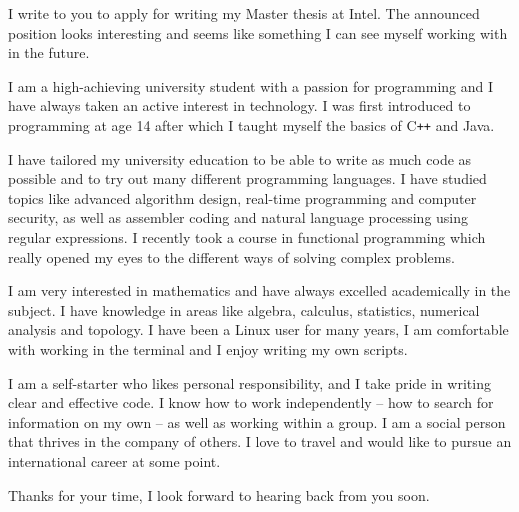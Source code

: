 I write to you to apply for writing my Master thesis at Intel. The announced position looks interesting and seems like something I can see myself working with in the future.

I am a high-achieving university student with a passion for programming and I have always taken an active interest in technology. I was first introduced to programming at age 14 after which I taught myself the basics of C\texttt{++} and Java.

I have tailored my university education to be able to write as much code as possible and to try out many different programming languages. I have studied topics like advanced algorithm design, real-time programming and computer security, as well as assembler coding and natural language processing using regular expressions. I recently took a course in functional programming which really opened my eyes to the different ways of solving complex problems.

I am very interested in mathematics and have always excelled academically in the subject. I have knowledge in areas like algebra, calculus, statistics, numerical analysis and topology. I have been a Linux user for many years, I am comfortable with working in the terminal and I enjoy writing my own scripts.

I am a self-starter who likes personal responsibility, and I take pride in writing clear and effective code. I know how to work independently – how to search for information on my own – as well as working within a group. I am a social person that thrives in the company of others. I love to travel and would like to pursue an international career at some point.

Thanks for your time, I look forward to hearing back from you soon.
